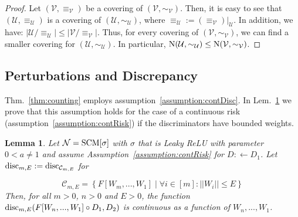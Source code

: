 \documentclass{article} %
\newtheorem{lem}{Lemma}
\newcommand{\disc}{\textnormal{disc}}
\newcommand{\Cov}{\textnormal{N}}
\begin{document}
 

\begin{proof} Let $(\mathcal{V},\equiv_\mathcal{V})$ be a covering of $(\mathcal{V},\sim_\mathcal{V})$. Then, it is easy to see that $(\mathcal{U},\equiv_\mathcal{U})$ is a covering of $(\mathcal{U},\sim_\mathcal{U})$, where $\equiv_{\mathcal{U}} := (\equiv_\mathcal{V})\big\vert_{\mathcal{U}}$. In addition, we have: $|\mathcal{U}/\equiv_{\mathcal{U}}| \leq |\mathcal{V}/\equiv_{\mathcal{V}}|$. Thus, for every covering of $(\mathcal{V},\sim_\mathcal{V})$, we can find a smaller covering for $(\mathcal{U},\sim_\mathcal{U})$. In particular, $\Cov(\mathcal{U},\sim_{\mathcal{U}}) \leq \Cov(\mathcal{V},\sim_{\mathcal{V}})$.
\end{proof}

 

\subsection{Perturbations and Discrepancy}

 

Thm.~\ref{thm:counting} employs assumption~\ref{assumption:contDisc}. In Lem.~\ref{lem:contDisc} we prove that this assumption holds for the case of a continuous risk (assumption~\ref{assumption:contRisk}) if the discriminators have bounded weights.


\contDisc*

\contRisk*

\begin{lem}\label{lem:contDisc} Let $\mathcal{N} = \textnormal{SCM}[\sigma]$ with $\sigma$ that is Leaky ReLU with parameter $0<a\neq 1$ and assume Assumption~\ref{assumption:contRisk} for $D:\leftarrow D_1$. Let $\disc_{m,E} := \disc_{\mathcal{C}_{m,E}}$ for 

\begin{equation}
\mathcal{C}_{m,E} = \left\{F[W_{m},...,W_1] \;\big\vert\; \forall i \in [m]: ||W_i|| \leq E\right\}
\end{equation}
Then, for all $m>0$, $n>0$ and $E>0$, the function $\disc_{m,E}(F[W_{n},...,W_1] \circ D_1,D_2)$ is continuous as a function of $W_n,...,W_1$. 
\end{lem}

 
\end{document}
